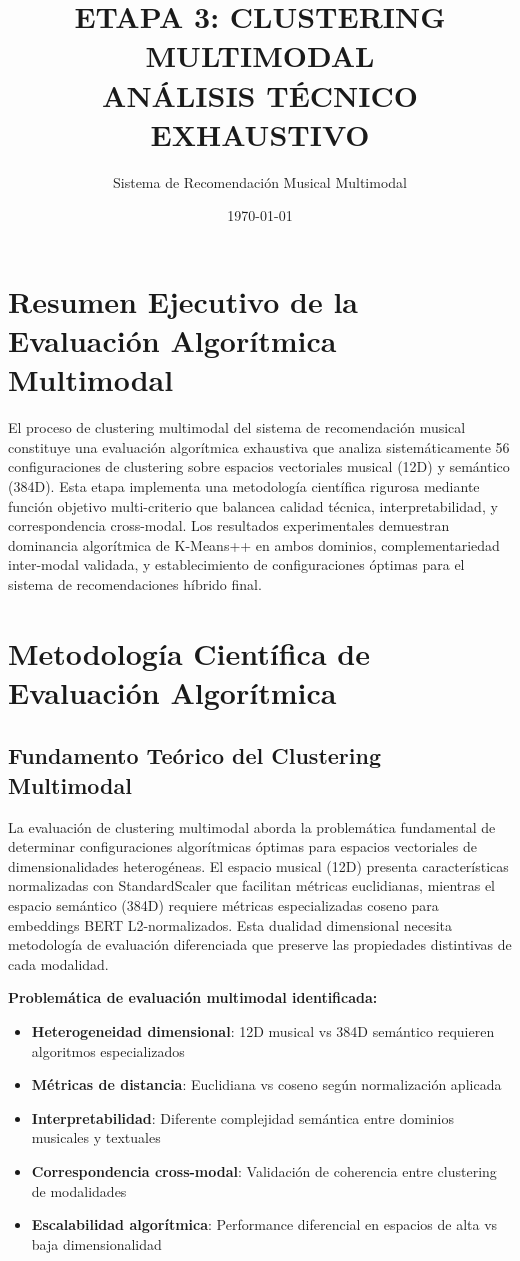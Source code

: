 \documentclass[12pt,a4paper]{article}
\title{\textbf{ETAPA 3: CLUSTERING MULTIMODAL\\ANÁLISIS TÉCNICO EXHAUSTIVO}}
\author{Sistema de Recomendación Musical Multimodal}
\date{\today}
\begin{document}
\maketitle
\thispagestyle{empty}

\newpage
\tableofcontents
\newpage

\section{Resumen Ejecutivo de la Evaluación Algorítmica Multimodal}

El proceso de clustering multimodal del sistema de recomendación musical constituye una evaluación algorítmica exhaustiva que analiza sistemáticamente 56 configuraciones de clustering sobre espacios vectoriales musical (12D) y semántico (384D). Esta etapa implementa una metodología científica rigurosa mediante función objetivo multi-criterio que balancea calidad técnica, interpretabilidad, y correspondencia cross-modal. Los resultados experimentales demuestran dominancia algorítmica de K-Means++ en ambos dominios, complementariedad inter-modal validada, y establecimiento de configuraciones óptimas para el sistema de recomendaciones híbrido final.

\section{Metodología Científica de Evaluación Algorítmica}

\subsection{Fundamento Teórico del Clustering Multimodal}

La evaluación de clustering multimodal aborda la problemática fundamental de determinar configuraciones algorítmicas óptimas para espacios vectoriales de dimensionalidades heterogéneas. El espacio musical (12D) presenta características normalizadas con StandardScaler que facilitan métricas euclidianas, mientras el espacio semántico (384D) requiere métricas especializadas coseno para embeddings BERT L2-normalizados. Esta dualidad dimensional necesita metodología de evaluación diferenciada que preserve las propiedades distintivas de cada modalidad.

\textbf{Problemática de evaluación multimodal identificada:}
\begin{itemize}
    \item \textbf{Heterogeneidad dimensional}: 12D musical vs 384D semántico requieren algoritmos especializados
    \item \textbf{Métricas de distancia}: Euclidiana vs coseno según normalización aplicada
    \item \textbf{Interpretabilidad}: Diferente complejidad semántica entre dominios musicales y textuales
    \item \textbf{Correspondencia cross-modal}: Validación de coherencia entre clustering de modalidades
    \item \textbf{Escalabilidad algorítmica}: Performance diferencial en espacios de alta vs baja dimensionalidad
\end{itemize}
\end{document}
